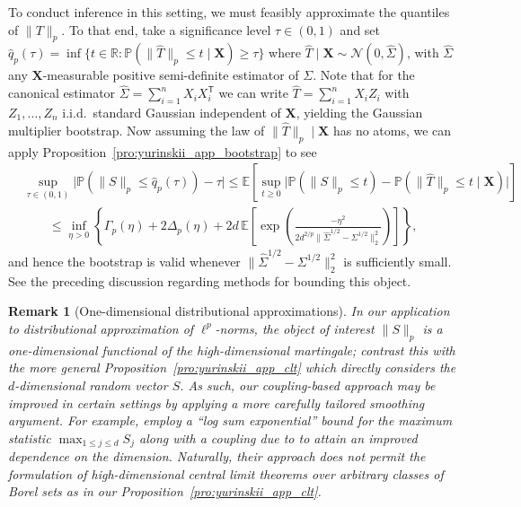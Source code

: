 \documentclass[11pt,lof]{puthesis}
\renewcommand{\P}{\ensuremath{\mathbb{P}}}
\newcommand{\R}{\ensuremath{\mathbb{R}}}
\newcommand{\E}{\ensuremath{\mathbb{E}}}
\newcommand{\bX}{\ensuremath{\mathbf{X}}}
\newcommand{\cN}{\ensuremath{\mathcal{N}}}
\newcommand{\T}{\ensuremath{\mathsf{T}}}
\theoremstyle{break}
\newtheorem{remark}{Remark}[section]
\theoremstyle{proof}
\begin{document}
To conduct inference in this setting, we must feasibly
approximate the quantiles of $\|T\|_p$.
To that end, take a significance level $\tau\in(0,1)$ and set
%
$\hat q_p(\tau) =
\inf \big\{t \in \R: \P(\|\hat T\|_p \leq t \mid \bX) \geq \tau \}$
where $\hat T \mid \bX \sim \cN(0, \hat\Sigma)$,
%
with $\hat\Sigma$ any $\bX$-measurable positive semi-definite
estimator of $\Sigma$.
Note that for the canonical estimator $\hat\Sigma = \sum_{i=1}^n X_i X_i^\T$
we can write $\hat T =\sum_{i=1}^n X_i Z_i$ with
$Z_1,\dots,Z_n$ i.i.d.\ standard Gaussian independent of $\bX$,
yielding the Gaussian multiplier bootstrap.
Now assuming
the law of $\|\hat T\|_p \mid \bX$ has no atoms,
we can apply Proposition~\ref{pro:yurinskii_app_bootstrap}
to see
%
\begin{align*}
&\sup_{\tau\in(0,1)}
\big|\P\left(\|S\|_p \leq \hat q_p(\tau)\right) - \tau \big|
\leq
\E\left[
\sup_{t \geq 0}
\big|
\P(\|S\|_p \leq t)
- \P(\|\hat T\|_p \leq t \mid \bX)
\big|
\right] \\
&\qquad\leq
\inf_{\eta>0}
\left\{ \Gamma_p(\eta)
+ 2 \Delta_p(\eta)
+ 2d\, \E\left[
\exp\left(\frac{-\eta^2}
{2d^{2/p}\big\|\hat \Sigma^{1/2} - \Sigma^{1/2}\big\|_2^2}\right)
\right]
\right\},
\end{align*}
%
and hence the bootstrap is valid whenever
$\|\hat \Sigma^{1/2} - \Sigma^{1/2}\big\|_2^2$ is sufficiently small. See the
preceding discussion regarding methods for bounding this object.

\begin{remark}[One-dimensional distributional approximations]
In our application to distributional approximation of $\ell^p$-norms,
the object of interest $\|S\|_p$ is a
one-dimensional functional of the high-dimensional martingale;
contrast this with the more general Proposition~\ref{pro:yurinskii_app_clt}
which
directly considers the $d$-dimensional random vector $S$.
As such, our coupling-based approach may be improved in certain settings
by applying a more carefully tailored smoothing argument.
For example, \citet{belloni2018high}
employ a ``log sum exponential'' bound
\citep[see also][]{chernozhukov2013gaussian}
for the maximum statistic
$\max_{1 \leq j \leq d} S_j$
along with a coupling due to \citet{chernozhukov2014gaussian} to attain
an improved dependence on the dimension.
Naturally, their approach does not permit the formulation of
high-dimensional central limit theorems over arbitrary classes of
Borel sets as in our Proposition~\ref{pro:yurinskii_app_clt}.
\end{remark}

\clearpage
{}


\end{document}
